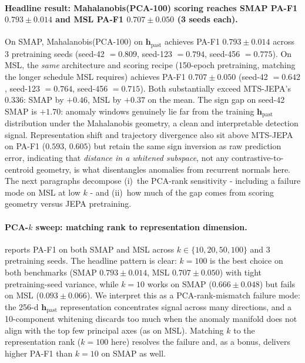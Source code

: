 \documentclass{article}
\newcommand{\h}{\mathbf{h}}
\begin{document}
\paragraph{Headline result: Mahalanobis(PCA-100) scoring reaches SMAP PA-F1 $0.793 \pm 0.014$ and MSL PA-F1 $0.707 \pm 0.050$ (3 seeds each).} On SMAP, Mahalanobis(PCA-100) on $\h_\text{past}$ achieves PA-F1 $\mathbf{0.793 \pm 0.014}$ across 3 pretraining seeds (seed-42 $=0.809$, seed-123 $=0.794$, seed-456 $=0.775$). On MSL, the \emph{same} architecture and scoring recipe (150-epoch pretraining, matching the longer schedule MSL requires) achieves PA-F1 $\mathbf{0.707 \pm 0.050}$ (seed-42 $=0.642$, seed-123 $=0.764$, seed-456 $=0.715$). Both substantially exceed MTS-JEPA's $0.336$: SMAP by $+0.46$, MSL by $+0.37$ on the mean. The sign gap on seed-42 SMAP is $+1.70$: anomaly windows genuinely lie far from the training $\h_\text{past}$ distribution under the Mahalanobis geometry, a clean and interpretable detection signal. Representation shift and trajectory divergence also sit above MTS-JEPA on PA-F1 ($0.593$, $0.605$) but retain the same sign inversion as raw prediction error, indicating that \emph{distance in a whitened subspace}, not any contrastive-to-centroid geometry, is what disentangles anomalies from recurrent normals here. The next paragraphs decompose (i)~the PCA-rank sensitivity - including a failure mode on MSL at low $k$ - and (ii)~how much of the gap comes from scoring geometry versus JEPA pretraining.

\paragraph{PCA-$k$ sweep: matching rank to representation dimension.}  reports PA-F1 on both SMAP and MSL across $k \in \{10, 20, 50, 100\}$ and 3 pretraining seeds. The headline pattern is clear: $k=100$ is the best choice on both benchmarks (SMAP $0.793 \pm 0.014$, MSL $0.707 \pm 0.050$) with tight pretraining-seed variance, while $k=10$ works on SMAP ($0.666 \pm 0.048$) but fails on MSL ($0.093 \pm 0.066$). We interpret this as a PCA-rank-mismatch failure mode: the 256-d $\h_\text{past}$ representation concentrates signal across many directions, and a 10-component whitening discards too much when the anomaly manifold does not align with the top few principal axes (as on MSL). Matching $k$ to the representation rank ($k=100$ here) resolves the failure and, as a bonus, delivers higher PA-F1 than $k=10$ on SMAP as well.
\end{document}
